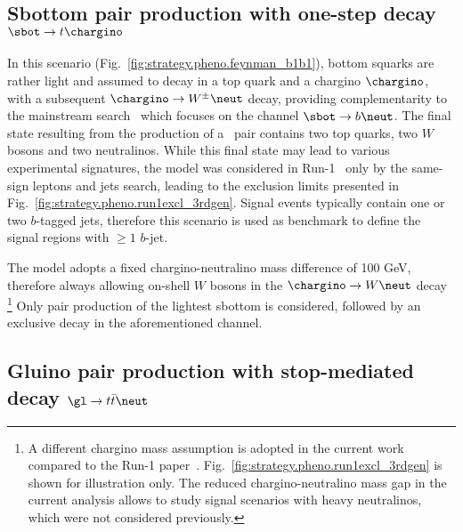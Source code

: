 \subsection*{Sbottom pair production with one-step decay $\sbot\to t\chargino$}
\label{subsec:signals_sbot}

In this scenario (Fig.~\ref{fig:strategy.pheno.feynman_b1b1}), bottom squarks are rather light and assumed to decay in a top quark and a chargino $\chargino$, 
with a subsequent $\chargino\to W^\pm\neut$ decay, 
providing complementarity to the mainstream search~\cite{ATLAS-CONF-2015-066} which focuses on the channel $\sbot\to b\neut$. 
The final state resulting from the production of a \sbsb\ pair contains two top quarks, two $W$ bosons and two neutralinos. 
While this final state may lead to various experimental signatures, 
the model was considered in Run-1~\cite{SUSY-2014-06} 
only by the same-sign leptons and jets search, leading to the exclusion limits presented in Fig.~\ref{fig:strategy.pheno.run1excl_3rdgen}. 
Signal events typically contain one or two $b$-tagged jets, 
therefore this scenario is used as benchmark to define the signal regions with $\ge 1$ $b$-jet. 

The model adopts a fixed chargino-neutralino mass difference of 100 GeV, 
therefore always allowing on-shell $W$ bosons in the $\chargino\to W\neut$ decay
\footnote{A different chargino mass assumption is adopted in the current 
work compared to the Run-1 paper~\cite{SUSY-2014-06}.
Fig.~\ref{fig:strategy.pheno.run1excl_3rdgen} is shown for illustration only.
The reduced chargino-neutralino mass gap in the current analysis 
allows to study signal scenarios with heavy neutralinos, which were not considered previously.}
Only pair production of the lightest sbottom is considered, followed by an exclusive decay in the aforementioned channel. 


\subsection*{Gluino pair production with stop-mediated decay $\gl\to t\bar t\neut$}
\label{subsec:signals_gtt}

